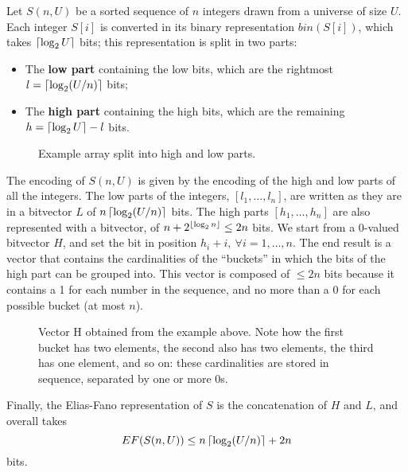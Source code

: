 Let $S(n,U)$ be a sorted sequence of $n$ integers drawn from a universe of size $U$. Each integer $S[i]$ is converted in its binary representation $\textit{bin}(S[i])$, which takes $\left\lceil\log_2 U\right\rceil$ bits; this representation is split in two parts:
\begin{itemize}
    \item The \textbf{low part} containing the low bits, which are the rightmost $l = \left\lceil\log_2(U/n)\right\rceil$ bits;
    \item The \textbf{high part} containing the high bits, which are the remaining $h = \left\lceil\log_2 U\right\rceil - l$ bits.
\end{itemize}
\begin{figure}[!ht]
    \centering
    
    \caption{Example array split into high and low parts.}
    \label{fig:elias-fano-split}
\end{figure} 
The encoding of $S(n,U)$ is given by the encoding of the high and low parts of all the integers. The low parts of the integers, $[l_1, \dots, l_n]$, are written as they are in a bitvector $L$ of $n \left\lceil\log_2 (U/n)\right\rceil$ bits. The high parts $[h_1, \dots, h_n]$ are also represented with a bitvector, of $n + 2^{\left\lfloor\log_2 n\right\rfloor} \leq 2n$ bits. We start from a 0-valued bitvector $H$, and set the bit in position $h_i + i, \ \forall i = 1, \dots, n$. The end result is a vector that contains the cardinalities of the ``buckets'' in which the bits of the high part can be grouped into. This vector is composed of $\leq 2n$ bits because it contains a 1 for each number in the sequence, and no more than a 0 for each possible bucket (at most $n$).
\begin{figure}[H]
    \centering
    
    \caption{Vector H obtained from the example above. Note how the first bucket has two elements, the second also has two elements, the third has one element, and so on: these cardinalities are stored in sequence, separated by one or more 0s.}
    \label{fig:elias-fano-H}
\end{figure}
\noindent Finally, the Elias-Fano representation of $S$ is the concatenation of $H$ and $L$, and overall takes
\begin{equation*}
    EF(S(n,U)) \leq n \left\lceil\log_2 (U/n)\right\rceil + 2n
\end{equation*}
bits.

